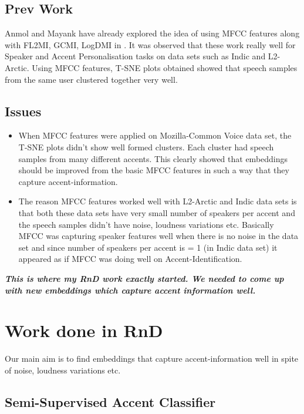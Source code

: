 \documentclass[12pt, a4paper, twoside]{article}
\begin{document}
\subsection{Prev Work}

Anmol and Mayank have already explored the idea of using MFCC features along with FL2MI,
GCMI, LogDMI in \cite{kothyari2021personalizing}. It was observed that these work really well
for Speaker and Accent Personalisation tasks on data sets such as Indic and L2-Arctic. Using MFCC features, T-SNE plots
obtained showed that speech samples from the same user clustered together very well.

\subsection{Issues}
\begin{itemize}
    \item When MFCC features were applied on Mozilla-Common Voice data set, the T-SNE plots didn't show
          well formed clusters. Each cluster had speech samples from many different accents. This clearly showed that embeddings should
          be improved from the basic MFCC features in such a way that they capture accent-information.
    \item The reason MFCC features worked well with L2-Arctic and Indic data sets is that both these data sets have very
          small number of speakers per accent and the speech samples didn't have noise, loudness variations etc.
          Basically MFCC was capturing speaker features well when there is no noise in the data set and since number of speakers
          per accent is = 1 (in Indic data set) it appeared as if MFCC was doing well on Accent-Identification.
\end{itemize}

\textit{\textbf{This is where my RnD work exactly started. We needed to come up with new embeddings which capture accent
        information well.}}
\clearpage
\section{Work done in RnD}
Our main aim is to find embeddings that capture accent-information well in spite of noise, loudness variations etc.
\subsection{Semi-Supervised Accent Classifier}
\end{document}
